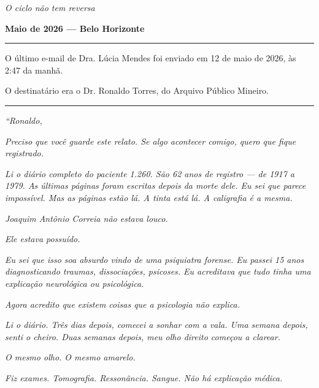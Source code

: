 
\noindent \textit{O ciclo não tem reversa}

\noindent \textbf{Maio de 2026 --- Belo Horizonte}

\vspace{0.5em}\noindent\rule{\textwidth}{0.5pt}\vspace{0.5em}

\noindent O último e-mail de Dra. Lúcia Mendes foi enviado em 12 de maio de 2026, às 2:47 da manhã.

\noindent O destinatário era o Dr. Ronaldo Torres, do Arquivo Público Mineiro.

\vspace{0.5em}\noindent\rule{\textwidth}{0.5pt}\vspace{0.5em}

\noindent \textit{\textquotedblleft{}Ronaldo,}

\noindent \textit{Preciso que você guarde este relato. Se algo acontecer comigo, quero que fique registrado.}

\noindent \textit{Li o diário completo do paciente 1.260. São 62 anos de registro --- de 1917 a 1979. As últimas páginas foram escritas depois da morte dele. Eu sei que parece impossível. Mas as páginas estão lá. A tinta está lá. A caligrafia é a mesma.}

\noindent \textit{Joaquim Antônio Correia não estava louco.}

\noindent \textit{Ele estava possuído.}

\noindent \textit{Eu sei que isso soa absurdo vindo de uma psiquiatra forense. Eu passei 15 anos diagnosticando traumas, dissociações, psicoses. Eu acreditava que tudo tinha uma explicação neurológica ou psicológica.}

\noindent \textit{Agora acredito que existem coisas que a psicologia não explica.}

\noindent \textit{Li o diário. Três dias depois, comecei a sonhar com a vala. Uma semana depois, senti o cheiro. Duas semanas depois, meu olho direito começou a clarear.}

\noindent \textit{O mesmo olho. O mesmo amarelo.}

\noindent \textit{Fiz exames. Tomografia. Ressonância. Sangue. Não há explicação médica.}

